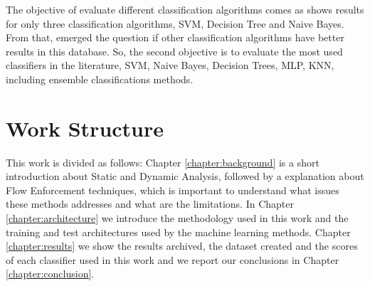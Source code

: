 The objective of evaluate different classification algorithms comes as \cite{rasthofer2014machine} shows results  for only three classification algorithms, SVM, Decision Tree and Naive Bayes. From that, emerged the question if other classification algorithms have better results in this database. So, the second objective is to evaluate the most used classifiers in the literature, SVM, Naive Bayes, Decision Trees, MLP, KNN, including ensemble classifications methods.


\section{Work Structure}\label{section:structure}

This work is divided as follows: Chapter \ref{chapter:background} is a short introduction about Static and Dynamic Analysis, followed by a explanation about Flow Enforcement techniques, which is important to understand what issues these methods addresses and what are the limitations. In Chapter \ref{chapter:architecture} we introduce the methodology used in this work and the training and test architectures used by the machine learning methods. Chapter \ref{chapter:results} we show the results archived, the dataset created and the scores of each classifier used in this work and we report our conclusions in Chapter \ref{chapter:conclusion}.
